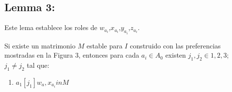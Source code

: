\documentclass{article}
\begin{document}
\subsection{Lemma 3:}
Este lema establece los roles de $w_{a_i}$,$x_{a_i}$,$y_{a_i}$,$z_{a_i}$.

Si existe un matrimonio $M$ estable para $I$ construido con las preferencias mostradas en la Figura 3, entonces para cada $a_i \in A_0$ existen $j_1,j_2 \in 1,2,3$; $j_1 \neq j_2$ tal que:
\begin{enumerate}
    \item $a_1[j_1]w_a,x_{a_i} in M$
\end{enumerate}
\end{document}
